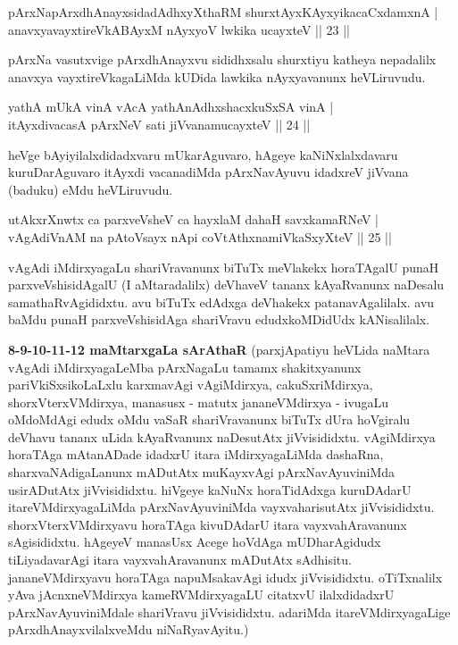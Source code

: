 \begin{shl}
pArxNapArxdhAnayxsidadAdhxyXthaRM shurxtAyx\s \s KAyxyikacaCxdamxnA | \\
anavxyavayxtireVkABAyxM nAyxyoV lwkika ucayxteV \hfill|| 23 || 
\end{shl}

\begin{artha}
pArxNa vasutxvige pArxdhAnayxvu sididhxsalu shurxtiyu katheya nepadalilx anavxya vayxtireVkagaLiMda kUDida lawkika nAyxyavanunx heVLiruvudu.
\end{artha}


\begin{shl}
yathA mUkA vinA vAcA yathA\s nAdhxshacxkuSxSA vinA | \\
itAyxdivacasA pArxNeV sati jiVvanamucayxteV \hfill|| 24 || 
\end{shl}

\begin{artha}
heVge bAyiyilalxdidadxvaru mUkarAguvaro, hAgeye kaNiNxlalxdavaru kuruDarAguvaro itAyxdi vacanadiMda pArxNavAyuvu idadxreV jiVvana (baduku) eMdu heVLiruvudu.
\end{artha}

\begin{shl}
utAkxrXnwtx ca parxveVsheV ca hayxlaM dahaH savxkamaRNeV | \\
vAgAdiVnAM na pAtoV\s sayx nApi coVtAthxnamiVkaSxyXteV \hfill|| 25 || 
\end{shl}

\begin{artha}
vAgAdi iMdirxyagaLu shariVravanunx biTuTx meVlakekx horaTAgalU punaH parxveVshisidAgalU (I aMtaradalilx) deVhaveV tananx kAyaRvanunx naDesalu samathaRvAgididxtu. avu biTuTx edAdxga deVhakekx patanavAgalilalx. avu baMdu punaH parxveVshisidAga shariVravu edudxkoMDidUdx kANisalilalx.
\end{artha}

\begin{artha}
\textbf{8-9-10-11-12 maMtarxgaLa sArAthaR \ndash }
(parxjApatiyu heVLida naMtara vAgAdi iMdirxyagaLeMba pArxNagaLu tamamx shakitxyanunx pariVkiSxsikoLaLxlu karxmavAgi vAgiMdirxya, cakuSxriMdirxya, shorxVterxVMdirxya, manasusx - matutx jananeVMdirxya - ivugaLu oMdoMdAgi edudx oMdu vaSaR shariVravanunx biTuTx dUra hoVgiralu deVhavu tananx uLida kAyaRvanunx naDesutAtx jiVvisididxtu. vAgiMdirxya horaTAga mAtanADade idadxrU itara iMdirxyagaLiMda dashaRna, sharxvaNAdigaLanunx mADutAtx muKayxvAgi pArxNavAyuviniMda usirADutAtx jiVvisididxtu. hiVgeye kaNuNx horaTidAdxga kuruDAdarU itareVMdirxyagaLiMda pArxNavAyuviniMda vayxvaharisutAtx jiVvisididxtu. shorxVterxVMdirxyavu horaTAga kivuDAdarU itara vayxvahAravanunx sAgisididxtu. hAgeyeV manasUsx Acege hoVdAga mUDharAgidudx tiLiyadavarAgi itara vayxvahAravanunx mADutAtx sAdhisitu. jananeVMdirxyavu horaTAga napuMsakavAgi idudx jiVvisididxtu. oTiTxnalilx yAva jAcnxneVMdirxya kameRVMdirxyagaLU citatxvU ilalxdidadxrU pArxNavAyuviniMdale shariVravu jiVvisididxtu. adariMda itareVMdirxyagaLige pArxdhAnayxvilalxveMdu niNaRyavAyitu.)
\end{artha}

